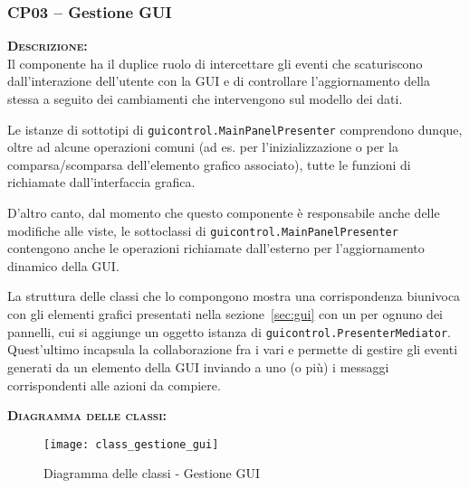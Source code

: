 \subsubsection{CP03 -- Gestione GUI}
\begin{description}
	\item{\scshape\bfseries Descrizione:}\\
Il componente ha il duplice ruolo di intercettare gli eventi che scaturiscono dall'interazione dell'utente con la GUI e di controllare l'aggiornamento della stessa a seguito dei cambiamenti che intervengono sul modello dei dati.

Le istanze di sottotipi di \texttt{guicontrol.MainPanelPresenter} comprendono dunque, oltre ad alcune operazioni comuni (ad es. per l'inizializzazione o per la comparsa/scomparsa dell'elemento grafico associato), tutte le funzioni di  richiamate dall'interfaccia grafica.

D'altro canto, dal momento che questo componente è responsabile anche delle modifiche alle viste, le sottoclassi di \texttt{guicontrol.MainPanelPresenter} contengono anche le operazioni richiamate dall'esterno per l'aggiornamento dinamico della GUI\@.

La struttura delle classi che lo compongono mostra una corrispondenza biunivoca con gli elementi grafici presentati nella sezione~\ref{sec:gui} con un  per ognuno dei pannelli, cui si aggiunge un oggetto istanza di \texttt{guicontrol.PresenterMediator}. Quest'ultimo incapsula la collaborazione fra i vari  e permette di gestire gli eventi generati da un elemento della GUI inviando a uno (o più)  i messaggi corrispondenti alle azioni da compiere.

	\item{\scshape\bfseries Diagramma delle classi:}\\
  \begin{figure}[H]
    \centering
    \texttt{[image: class\_gestione\_gui]}
    \caption{Diagramma delle classi - Gestione GUI}\label{fig:gestionegui}
  \end{figure}


\end{description}

